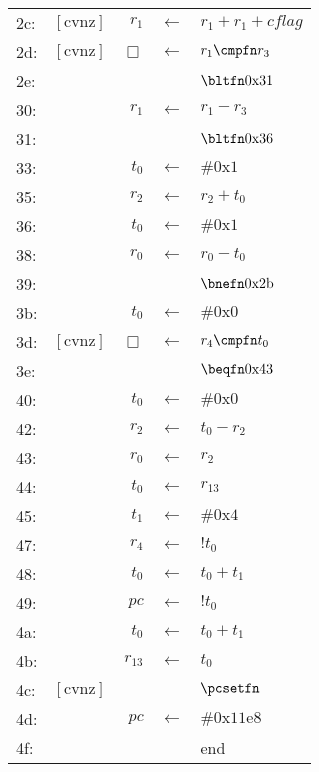 \begin{longtable}{lrrcl}
2c:& $\mathrm{[cvnz]}$ & $r_1$ & $\leftarrow$ & $r_1 + r_1 + cflag$\\
2d:& $\mathrm{[cvnz]}$ & $\Box$ & $\leftarrow$ & $r_1 \cmpfn r_3$\\
2e:& & & & $\bltfn \mathrm{0x31}$\\
30:& & $r_1$ & $\leftarrow$ & $r_1 - r_3$\\
31:& & & & $\bltfn \mathrm{0x36}$\\
33:& & $t_0$ & $\leftarrow$ & $\#\mathrm{0x1}$\\
35:& & $r_2$ & $\leftarrow$ & $r_2 + t_0$\\
36:& & $t_0$ & $\leftarrow$ & $\#\mathrm{0x1}$\\
38:& & $r_0$ & $\leftarrow$ & $r_0 - t_0$\\
39:& & & & $\bnefn \mathrm{0x2b}$\\
3b:& & $t_0$ & $\leftarrow$ & $\#\mathrm{0x0}$\\
3d:& $\mathrm{[cvnz]}$ & $\Box$ & $\leftarrow$ & $r_4 \cmpfn t_0$\\
3e:& & & & $\beqfn \mathrm{0x43}$\\
40:& & $t_0$ & $\leftarrow$ & $\#\mathrm{0x0}$\\
42:& & $r_2$ & $\leftarrow$ & $t_0 - r_2$\\
43:& & $r_0$ & $\leftarrow$ & $r_2$\\
44:& & $t_0$ & $\leftarrow$ & $r_{13}$\\
45:& & $t_1$ & $\leftarrow$ & $\#\mathrm{0x4}$\\
47:& & $r_4$ & $\leftarrow$ & $!t_0$\\
48:& & $t_0$ & $\leftarrow$ & $t_0 + t_1$\\
49:& & $pc$ & $\leftarrow$ & $!t_0$\\
4a:& & $t_0$ & $\leftarrow$ & $t_0 + t_1$\\
4b:& & $r_{13}$ & $\leftarrow$ & $t_0$\\
4c:& $\mathrm{[cvnz]}$ & & & $\pcsetfn$\\
4d:& & $pc$ & $\leftarrow$ & $\#\mathrm{0x11e8}$\\
4f:& & & &end
\end{longtable}
